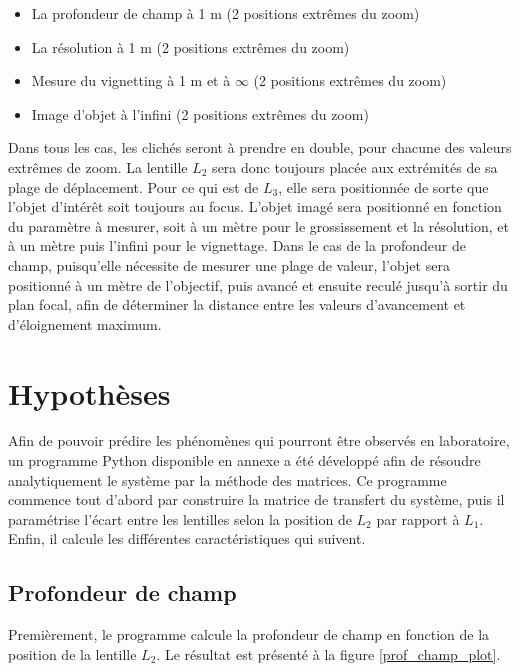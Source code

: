 \documentclass[11pt,letterpaper]{article}
\begin{document}
\begin{itemize}
    \item La profondeur de champ à 1 m (2 positions extrêmes du zoom)
    \item La résolution à 1 m (2 positions extrêmes du zoom)
    \item Mesure du vignetting à 1 m et à $\infty$ (2 positions extrêmes du zoom)
    \item Image d’objet à l’infini (2 positions extrêmes du zoom)
\end{itemize}

Dans tous les cas, les clichés seront à prendre en double, pour chacune des valeurs extrêmes de zoom. La lentille $L_2$ sera donc toujours placée aux extrémités de sa plage de déplacement. Pour ce qui est de $L_3$, elle sera positionnée de sorte que l'objet d'intérêt soit toujours au focus. L'objet imagé sera positionné en fonction du paramètre à mesurer, soit à un mètre pour le grossissement et la résolution, et à un mètre puis l'infini pour le vignettage. Dans le cas de la profondeur de champ, puisqu'elle nécessite de mesurer une plage de valeur, l'objet sera positionné à un mètre de l'objectif, puis avancé et ensuite reculé jusqu'à sortir du plan focal, afin de déterminer la distance entre les valeurs d'avancement et d'éloignement maximum.

\section{Hypothèses}


Afin de pouvoir prédire les phénomènes qui pourront être observés en laboratoire, un
programme Python disponible en annexe a été développé afin de résoudre analytiquement
le système par la méthode des matrices. Ce programme commence tout d'abord par construire
la matrice de transfert du système, puis il paramétrise l'écart entre les lentilles selon
la position de $L_2$ par rapport à $L_1$. Enfin, il calcule les différentes caractéristiques
qui suivent.

\subsection{Profondeur de champ}

Premièrement, le programme calcule la profondeur de champ en fonction de la position de
la lentille $L_2$. Le résultat est présenté à la figure \ref{prof_champ_plot}.
\end{document}
